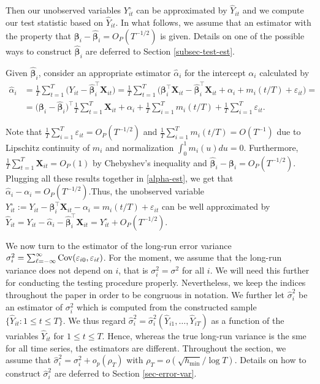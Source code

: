 \documentclass[a4paper,12pt]{article}
\begin{document}
Then our unobserved variables $Y_{it}^\circ$ can be approximated by $\widehat{Y}_{it}$ and we compute our test statistic based on $\widehat{Y}_{it}$. In what follows, we assume that an estimator with the property that $\bm{\beta}_i - \widehat{\bm{\beta}}_i = O_P(T^{-1/2})$ is given.  Details on one of the possible ways to construct $\widehat{\bm{\beta}}_i$ are deferred to Section \ref{subsec-test-est}.

Given $\widehat{\bm{\beta}}_i$, consider an appropriate estimator $\widehat{\alpha}_{i}$ for the intercept $\alpha_i$ calculated by
\begin{align}\label{alpha-est}
\widehat{\alpha}_i &= \frac{1}{T}\sum_{t=1}^T \big(Y_{it} - \widehat{\bm{\beta}}_i^\top \mathbf{X}_{it}\big) = \frac{1}{T}\sum_{t=1}^T \big(\bm{\beta}_i^\top \mathbf{X}_{it} - \widehat{\bm{\beta}}_i^\top \mathbf{X}_{it} + \alpha_i + m_i(t/T) + \varepsilon_{it}\big) =\\
&= \big(\bm{\beta}_i - \widehat{\bm{\beta}}_i \big)^\top\frac{1}{T}\sum_{t=1}^T  \mathbf{X}_{it} + \alpha_i + \frac{1}{T}\sum_{i=1}^T m_i(t/T) + \frac{1}{T}\sum_{i=1}^T \varepsilon_{it}.\nonumber
\end{align}

Note that $\frac{1}{T}\sum_{i=1}^T \varepsilon_{it} = O_P(T^{-1/2})$ and $\frac{1}{T}\sum_{i=1}^T m_i(t/T) = O(T^{-1})$ due to Lipschitz continuity of $m_i$ and normalization $\int_{0}^1 m_i(u)du = 0$. Furthermore, $\frac{1}{T}\sum_{t=1}^T  \mathbf{X}_{it} = O_P(1)$ by Chebyshev's inequality and $\widehat{\bm{\beta}}_i - \bm{\beta}_i = O_P (T^{-1/2})$. Plugging all these results together in \eqref{alpha-est}, we get that $\widehat{\alpha}_i - \alpha_i = O_P(T^{-1/2})$.Thus, the unobserved variable $Y_{it}^\circ := Y_{it} - \bm{\beta}_i^\top \mathbf{X}_{it} - \alpha_i = m_i(t/T) + \varepsilon_{it}$ can be well approximated by $\widehat{Y}_{it} = Y_{it} -\widehat{\alpha}_i - \widehat{\bm{\beta}}_i^\top \mathbf{X}_{it} = Y_{it}^\circ + O_P(T^{-1/2})$.

We now turn to the estimator of the long-run error variance $\sigma_i^2 = \sum\nolimits_{\ell=-\infty}^{\infty} \textnormal{Cov}(\varepsilon_{i0}, \varepsilon_{i\ell})$. For the moment, we assume that the long-run variance does not depend on $i$, that is $\sigma_i^2 = \sigma^2$ for all $i$. We will need this further for conducting the testing procedure properly. Nevertheless, we keep the indices throughout the paper in order to be congruous in notation. We further let $\widehat{\sigma}_i^2$ be an estimator of $\sigma_i^2$ which is computed from the constructed sample $\{ \widehat{Y}_{it}: 1 \le t \le T \}$. We thus regard $\widehat{\sigma}_i^2 = \widehat{\sigma}_i^2(\widehat{Y}_{i1},\ldots,\widehat{Y}_{iT})$ as a function of the variables $\widehat{Y}_{it}$ for $1 \le t \le T$. Hence, whereas the true long-run variance is the sme for all time series, the estimators are different. Throughout the section, we assume that $\widehat{\sigma}_i^2 = \sigma_i^2 + o_p(\rho_T)$ with $\rho_T = o(\sqrt{h_{\min}}/\log T)$. Details on how to construct $\widehat{\sigma}_i^2$ are deferred to Section \ref{sec-error-var}. 
\end{document}
